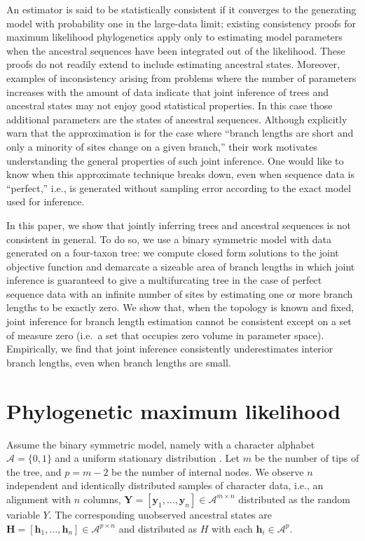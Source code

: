 \documentclass[11pt]{article}
\newcommand{\alphabet}{\mathcal{A}}
\newcommand{\fullAlignment}{\mathbf{Y}}
\newcommand{\alignmentColumn}{\mathbf{y}}
\newcommand{\alignmentColumnRV}{Y}
\newcommand{\fullAncestralStates}{\mathbf{H}}
\newcommand{\ancestralStateColumn}{\mathbf{h}}
\newcommand{\ancestralStateColumnRV}{H}
\newcommand{\nCols}{n}
\newcommand{\nSiteRows}{m}
\newcommand{\nAncestralStateRows}{p}
\begin{document}
An estimator is said to be statistically consistent if it converges to the generating model with probability one in the large-data limit; existing consistency proofs for maximum likelihood phylogenetics \citep{Allman2008-wd,Chai2011-ff,RoyChoudhury2015-ta} apply only to estimating model parameters when the ancestral sequences have been integrated out of the likelihood.
These proofs do not readily extend to include estimating ancestral states.
Moreover, examples of inconsistency arising from problems where the number of parameters increases with the amount of data \citep{Neyman1948-tt} indicate that joint inference of trees and ancestral states may not enjoy good statistical properties.
In this case those additional parameters are the states of ancestral sequences.
Although \citet{Sagulenko2018-xl} explicitly warn that the approximation is for the case where ``branch lengths are short and only a minority of sites change on a given branch,'' their work motivates understanding the general properties of such joint inference.
One would like to know when this approximate technique breaks down, even when sequence data is ``perfect,'' i.e., is generated without sampling error according to the exact model used for inference.

In this paper, we show that jointly inferring trees and ancestral sequences is not consistent in general.
To do so, we use a binary symmetric model with data generated on a four-taxon tree: we compute closed form solutions to the joint objective function and demarcate a sizeable area of branch lengths in which joint inference is guaranteed to give a multifurcating tree in the case of perfect sequence data with an infinite number of sites by estimating one or more branch lengths to be exactly zero.
We show that, when the topology is known and fixed, joint inference for branch length estimation cannot be consistent except on a set of measure zero (i.e.\ a set that occupies zero volume in parameter space).
Empirically, we find that joint inference consistently underestimates interior branch lengths, even when branch lengths are small.

\section*{Phylogenetic maximum likelihood}

Assume the binary symmetric model, namely with a character alphabet $\alphabet=\{0,1\}$ and a uniform stationary distribution \citep{Semple2003-em}.
Let $\nSiteRows$ be the number of tips of the tree, and $\nAncestralStateRows = \nSiteRows-2$ be the number of internal nodes.
We observe $\nCols$ independent and identically distributed samples of character data, i.e., an alignment with $\nCols$ columns, $\fullAlignment=[\alignmentColumn_1,\ldots,\alignmentColumn_\nCols]\in\alphabet^{\nSiteRows\times\nCols}$ distributed as the random variable $\alignmentColumnRV$.
The corresponding unobserved ancestral states are $\fullAncestralStates=[\ancestralStateColumn_1,\ldots,\ancestralStateColumn_\nCols]\in\alphabet^{\nAncestralStateRows\times\nCols}$ and distributed as $\ancestralStateColumnRV$ with each $\ancestralStateColumn_i\in\alphabet^\nAncestralStateRows$.
\end{document}
